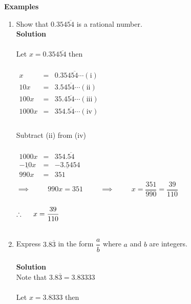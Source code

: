 \documentclass[11pt,a4paper]{article}
\begin{document}
\textbf{Examples}
\begin{enumerate}
\item Show that $0.354\overline{54}$ is a rational number.\\

\textbf{Solution}\\\\
Let  $x=0.354\overline{54}$ then\\\\   $
\begin{matrix}
 x & = & 0.354\overline{54}\cdots (\text{i})\\
                      10x & = & 3.54\overline{54}\cdots (\text{ii})\\
                      100x & = & 35.4\overline{54}\cdots (\text{iii})\\
                      1000x & = & 354.\overline{54}\cdots (\text{iv})\\
                      
\end{matrix}
$\\\\

Subtract (ii) from (iv)\\\\
$
\begin{matrix}
1000x & = & 354.\overline{54}\\
\underline{-10x} & = & \underline{- 3.5454}\\
990x & = & 351\\
\end{matrix}                      
 $ \\
 
$\implies \hspace{1cm} 990x=351\hspace{1cm}\implies \hspace{1cm} x=\dfrac{351}{990}=\dfrac{39}{110}$\\\\ 
$\therefore \hspace{0.5cm} x=\dfrac{39}{110}$\\\\



\item Express $3.8\overline{3}$ in the form $\dfrac{a}{b}$ where $a$ and $b$ are integers.\\\\

\textbf{Solution}\\
Note that $3.8\overline{3} = 3.83333$\\\\
Let $x=3.8333$ then\\


\end{enumerate}
\end{document}
